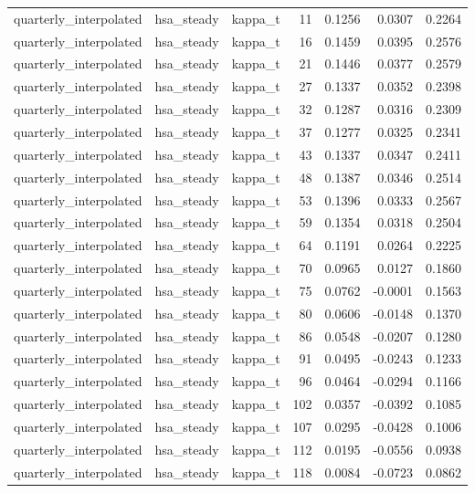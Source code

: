 \begin{tabular}{lllrrrr}
quarterly\_interpolated & hsa\_steady & kappa\_t & 11 & 0.1256 & 0.0307 & 0.2264 \\
quarterly\_interpolated & hsa\_steady & kappa\_t & 16 & 0.1459 & 0.0395 & 0.2576 \\
quarterly\_interpolated & hsa\_steady & kappa\_t & 21 & 0.1446 & 0.0377 & 0.2579 \\
quarterly\_interpolated & hsa\_steady & kappa\_t & 27 & 0.1337 & 0.0352 & 0.2398 \\
quarterly\_interpolated & hsa\_steady & kappa\_t & 32 & 0.1287 & 0.0316 & 0.2309 \\
quarterly\_interpolated & hsa\_steady & kappa\_t & 37 & 0.1277 & 0.0325 & 0.2341 \\
quarterly\_interpolated & hsa\_steady & kappa\_t & 43 & 0.1337 & 0.0347 & 0.2411 \\
quarterly\_interpolated & hsa\_steady & kappa\_t & 48 & 0.1387 & 0.0346 & 0.2514 \\
quarterly\_interpolated & hsa\_steady & kappa\_t & 53 & 0.1396 & 0.0333 & 0.2567 \\
quarterly\_interpolated & hsa\_steady & kappa\_t & 59 & 0.1354 & 0.0318 & 0.2504 \\
quarterly\_interpolated & hsa\_steady & kappa\_t & 64 & 0.1191 & 0.0264 & 0.2225 \\
quarterly\_interpolated & hsa\_steady & kappa\_t & 70 & 0.0965 & 0.0127 & 0.1860 \\
quarterly\_interpolated & hsa\_steady & kappa\_t & 75 & 0.0762 & -0.0001 & 0.1563 \\
quarterly\_interpolated & hsa\_steady & kappa\_t & 80 & 0.0606 & -0.0148 & 0.1370 \\
quarterly\_interpolated & hsa\_steady & kappa\_t & 86 & 0.0548 & -0.0207 & 0.1280 \\
quarterly\_interpolated & hsa\_steady & kappa\_t & 91 & 0.0495 & -0.0243 & 0.1233 \\
quarterly\_interpolated & hsa\_steady & kappa\_t & 96 & 0.0464 & -0.0294 & 0.1166 \\
quarterly\_interpolated & hsa\_steady & kappa\_t & 102 & 0.0357 & -0.0392 & 0.1085 \\
quarterly\_interpolated & hsa\_steady & kappa\_t & 107 & 0.0295 & -0.0428 & 0.1006 \\
quarterly\_interpolated & hsa\_steady & kappa\_t & 112 & 0.0195 & -0.0556 & 0.0938 \\
quarterly\_interpolated & hsa\_steady & kappa\_t & 118 & 0.0084 & -0.0723 & 0.0862 \\

\end{tabular}
